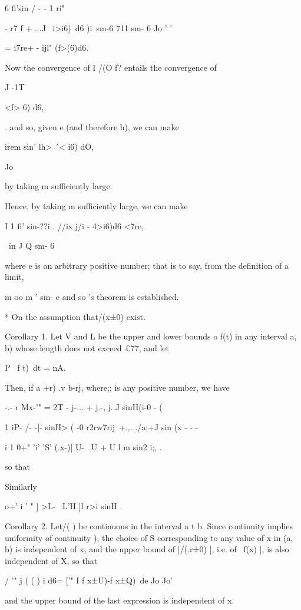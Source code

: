 6 fi'sin / - - 1 ri"

 - r7 f +  ...J \ i>i6)\ d6 )i\ sm-6 711 sm- 6 Jo ' '

= i7re+ - ijl" (f>(6)d6.

Now the convergence of I /(O f? entails the convergence of

J -1T

<f> 6) d6,

. and so, given e (and therefore h), we can make

 irem sin' lh> \'\ < i6) dO,

Jo

by taking m sufficiently large.

Hence, by taking m sufficiently large, we can make

I 1 fi' sin-??i . //ix j/i - 4>i6)d6 <7re,

\ in J Q sm- 6

where e is an arbitrary positive number; that is to say, from the
definition of a limit,

m oo m ' sm- e and so \Fejer's theorem is established.

* On the assumption that/(x±0) exist.

%
%

Corollary 1. Let V and L be the upper and lower bounds o f(t) in any
interval a, b) whose length does not exceed £77, and let

P \ f t)\ dt = nA.

Then, if a +r) .v b-rj, where;; is any positive number, we have

 -.- r Mx-'" = 2T - j-... + j.-, j..J sinH(i-0 - (

  1 iP- /- -|- sinH> ( -0 r2rw7rij\ +.,. ./a;+J sin (x - - -

i 1 0+" 'i' 'S' (.x-)| U- \ U + U l m sin2 i;, .

so that

Similarly

    o+' i ' " ] >L- \ L'H ]l r>i sinH .

Corollary 2. Let/( ) be continuous in the interval a t b. Since
continuity implies uniformity of continuity ), the choice of S
corresponding to any value of x in (a, b) is independent of x, and the
upper bound of |/(.r±0) |, i.e. of \ f(x) |, is also independent of X,
so that

/ '" j ( ( ) i d6= ['" I f x±U)-f x±Q)\ de Jo Jo'

and the upper bound of the last expression is independent of x.

